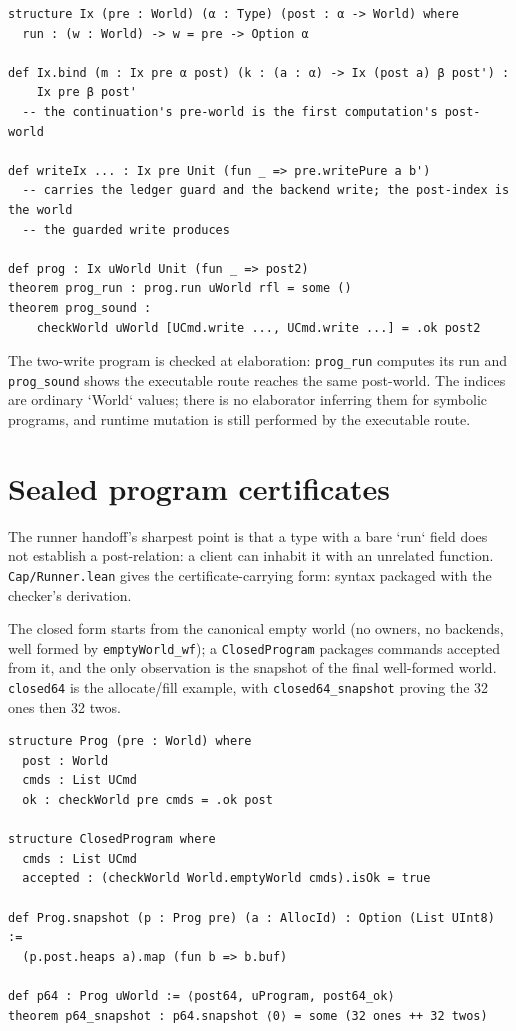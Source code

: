 \documentclass[10pt,a4paper]{article}
\newcommand{\file}[1]{\texttt{\small #1}}
\begin{document}
\begin{lstlisting}[caption={\file{Cap/Indexed.lean}.}]
structure Ix (pre : World) (α : Type) (post : α -> World) where
  run : (w : World) -> w = pre -> Option α

def Ix.bind (m : Ix pre α post) (k : (a : α) -> Ix (post a) β post') :
    Ix pre β post'
  -- the continuation's pre-world is the first computation's post-world

def writeIx ... : Ix pre Unit (fun _ => pre.writePure a b')
  -- carries the ledger guard and the backend write; the post-index is the world
  -- the guarded write produces

def prog : Ix uWorld Unit (fun _ => post2)
theorem prog_run : prog.run uWorld rfl = some ()
theorem prog_sound :
    checkWorld uWorld [UCmd.write ..., UCmd.write ...] = .ok post2
\end{lstlisting}

The two-write program is checked at elaboration: \texttt{prog\_run} computes its run and
\texttt{prog\_sound} shows the executable route reaches the same post-world. The indices
are ordinary `World` values; there is no elaborator inferring them for symbolic
programs, and runtime mutation is still performed by the executable route.

\section{Sealed program certificates}

The runner handoff's sharpest point is that a type with a bare `run` field does
not establish a post-relation: a client can inhabit it with an unrelated function.
\file{Cap/Runner.lean} gives the certificate-carrying form: syntax packaged with
the checker's derivation.

The closed form starts from the canonical empty world (no owners, no backends,
well formed by \texttt{emptyWorld\_wf}); a \texttt{ClosedProgram} packages
commands accepted from it, and the only observation is the snapshot of the final
well-formed world. \texttt{closed64} is the allocate/fill example, with
\texttt{closed64\_snapshot} proving the 32 ones then 32 twos.

\begin{lstlisting}[caption={\file{Cap/Runner.lean}.}]
structure Prog (pre : World) where
  post : World
  cmds : List UCmd
  ok : checkWorld pre cmds = .ok post

structure ClosedProgram where
  cmds : List UCmd
  accepted : (checkWorld World.emptyWorld cmds).isOk = true

def Prog.snapshot (p : Prog pre) (a : AllocId) : Option (List UInt8) :=
  (p.post.heaps a).map (fun b => b.buf)

def p64 : Prog uWorld := ⟨post64, uProgram, post64_ok⟩
theorem p64_snapshot : p64.snapshot ⟨0⟩ = some (32 ones ++ 32 twos)
\end{lstlisting}
\end{document}
